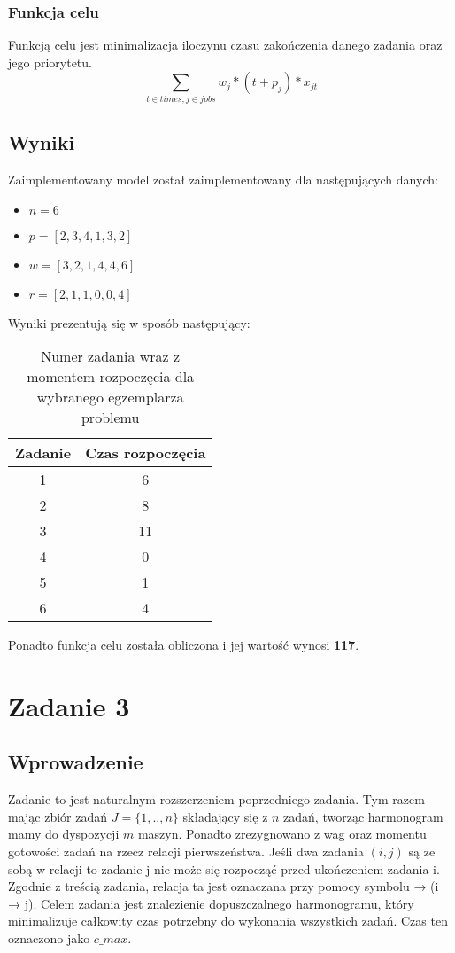 \documentclass[a4paper,14pt]{report}
\begin{document}
    \subsection{Funkcja celu}
        Funkcją celu jest minimalizacja iloczynu czasu zakończenia 
        danego zadania oraz jego priorytetu.
        \begin{equation}
            \sum_{t \in times, j \in jobs} w_{j} * (t+p_{j}) * x_{jt}
        \end{equation}
\section{Wyniki}
    Zaimplementowany model został zaimplementowany dla następujących danych:
    \begin{itemize}
        \item $n = 6$
        \item $p = [2,3,4,1,3,2] $
        \item $w = [3,2,1,4,4,6] $
        \item $r = [2,1,1,0,0,4] $
    \end{itemize}
    Wyniki prezentują się w sposób następujący:
    \begin{table}[H]
        \centering
        \begin{tabular}{|c | c |} 
        \hline
        Zadanie & Czas rozpoczęcia\\
        \hline
        1 & 6 \\
        2 & 8 \\
        3 & 11 \\
        4 & 0 \\
        5 & 1 \\
        6 & 4 \\
        \hline
        \end{tabular}
        \caption{Numer zadania wraz z momentem rozpoczęcia dla wybranego egzemplarza problemu}
    \end{table}
    Ponadto funkcja celu została obliczona i jej wartość wynosi \textbf{117}.


\chapter{Zadanie 3}
\section{Wprowadzenie}
    Zadanie to jest naturalnym rozszerzeniem poprzedniego zadania. Tym razem mając zbiór zadań $J = \{1,..,n\}$ składający się z $n$ zadań, 
    tworząc harmonogram mamy do dyspozycji $m$ maszyn. Ponadto zrezygnowano z wag oraz momentu gotowości zadań na rzecz relacji pierwszeństwa.
    Jeśli dwa zadania $(i,j)$ są ze sobą w relacji to zadanie j nie może się rozpocząć przed ukończeniem zadania i. Zgodnie z treścią zadania, relacja 
    ta jest oznaczana przy pomocy symbolu → (i → j). Celem zadania jest
    znalezienie dopuszczalnego harmonogramu, który minimalizuje całkowity czas potrzebny do wykonania wszystkich zadań. 
    Czas ten oznaczono jako $c\_max$.
\end{document}
